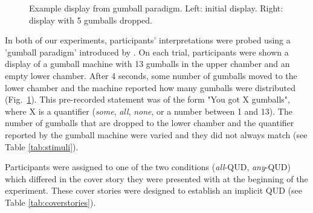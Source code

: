 \documentclass[10pt,letterpaper]{article}
\begin{document}
\begin{figure}
\caption{Example display from gumball paradigm. Left: initial display. Right: display with 5 gumballs dropped.  \label{fig:gumball-paradigm}}
\end{figure}

In both of our experiments, participants’ interpretations were probed using a ’gumball paradigm' introduced by . On each trial, participants were shown a display of a gumball machine with 13 gumballs in the upper chamber and an empty lower chamber. After 4 seconds, some number of gumballs moved to the lower chamber and the machine reported how many gumballs were distributed (Fig.~\ref{fig:gumball-paradigm}). This pre-recorded statement was of the form "You got X gumballs", where X is a quantifier (\textit{some},  \textit{all}, \textit{none}, or a number between 1 and 13). The number of gumballs that are dropped to the lower chamber and the quantifier reported by the gumball machine were varied and they did not always match (see Table \ref{tab:stimuli}).

Participants were assigned to one of the two conditions (\textit{all}-QUD, \textit{any}-QUD) which differed in the cover story they were presented with at the beginning of the experiment. These cover stories were designed to establish an implicit QUD (see Table \ref{tab:coverstories}).

\end{document}
